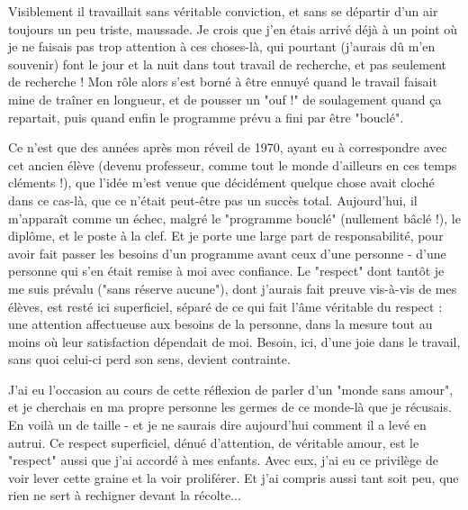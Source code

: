 Visiblement il travaillait sans véritable conviction, et sans se départir d'un air toujours un peu triste, maussade. Je crois que j'en étais arrivé déjà à un point où je ne faisais pas trop attention à ces choses-là, qui pourtant (j'aurais dû m'en souvenir) font le jour et la nuit dans tout travail de recherche, et pas seulement de recherche ! Mon rôle alors s'est borné à être ennuyé quand le travail faisait mine de traîner en longueur, et de pousser un "ouf !" de soulagement quand ça repartait, puis quand enfin le programme prévu a fini par être "bouclé".

Ce n'est que des années après mon réveil de 1970, ayant eu à correspondre avec cet ancien élève (devenu professeur, comme tout le monde d'ailleurs en ces temps cléments !), que l'idée m'est venue que décidément quelque chose avait cloché dans ce cas-là, que ce n'était peut-être pas un succès total. Aujourd'hui, il m'apparaît comme un échec, malgré le "programme bouclé" (nullement bâclé !), le diplôme, et le poste à la clef. Et je porte une large part de responsabilité, pour avoir fait passer les besoins d'un programme avant ceux d'une personne - d'une personne qui s'en était remise à moi avec confiance. Le "respect" dont tantôt je me suis prévalu ("sans réserve aucune"), dont j'aurais fait preuve vis-à-vis de mes élèves, est resté ici superficiel, séparé de ce qui fait l'âme véritable du respect : une attention affectueuse aux besoins de la personne, dans la mesure tout au moins où leur satisfaction dépendait de moi. Besoin, ici, d'une joie dans le travail, sans quoi celui-ci perd son sens, devient contrainte.

J'ai eu l'occasion au cours de cette réflexion de parler d'un "monde sans amour", et je cherchais en ma propre personne les germes de ce monde-là que je récusais. En voilà un de taille - et je ne saurais dire aujourd'hui comment il a levé en autrui. Ce respect superficiel, dénué d'attention, de véritable amour, est le "respect" aussi que j'ai accordé à mes enfants. Avec eux, j'ai eu ce privilège de voir lever cette graine et la voir proliférer. Et j'ai compris aussi tant soit peu, que rien ne sert à rechigner devant la récolte...




